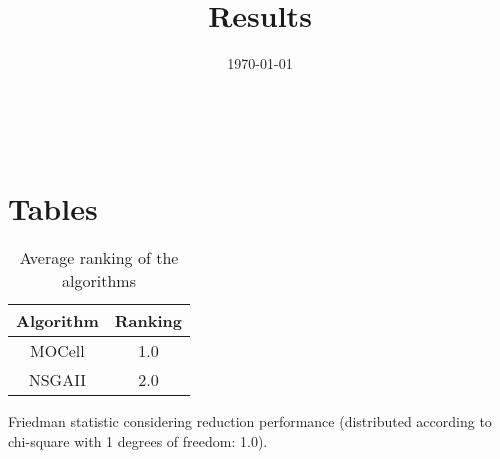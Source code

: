 \documentclass{article}
\title{Results}
\author{}
\date{\today}
\begin{document}
\oddsidemargin 0in \topmargin 0in\maketitle
\
\section{Tables}
\begin{table}[!htp]
\centering
\caption{Average ranking of the algorithms}
\begin{tabular}{c|c}
Algorithm&Ranking\\
\hline
MOCell&1.0\\
NSGAII&2.0\\
\end{tabular}
\end{table}


Friedman statistic considering reduction performance (distributed according to chi-square with 1 degrees of freedom: 1.0).
\end{document}
